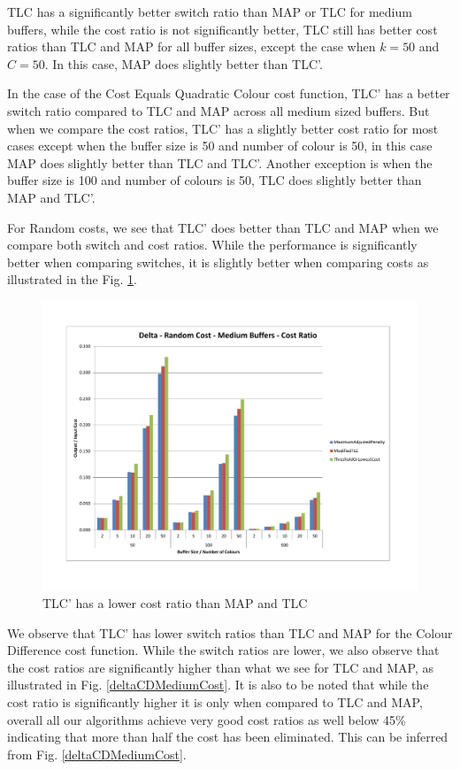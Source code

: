 TLC has a significantly better switch ratio than MAP or TLC for medium buffers, while the cost ratio is not significantly better, TLC still has better cost ratios than TLC and MAP for all buffer sizes, except the case when $k = 50$ and $C = 50$. In this case, MAP does slightly better than TLC'. 

In the case of the Cost Equals Quadratic Colour cost function, TLC' has a better switch ratio compared to TLC and MAP across all medium sized buffers. But when we compare the cost ratios, TLC' has a slightly better cost ratio for most cases except when the buffer size is 50 and number of colour is 50, in this case MAP does slightly better than TLC and TLC'. Another exception is when the buffer size is 100 and number of colours is 50, TLC does slightly better than MAP and TLC'. 

For Random costs, we see that TLC' does better than TLC and MAP when we compare both switch and cost ratios. While the performance is significantly better when comparing switches, it is slightly better when comparing costs as illustrated in the Fig.  \ref{deltaRCMediumCost}.

\begin{figure}[ht]
\centering 
\includegraphics[scale=0.60]{Delta-rc-medium-cost.pdf}
\caption{TLC' has a lower cost ratio than MAP and TLC}
\label{deltaRCMediumCost}
\end{figure}   

We observe that TLC' has lower switch ratios than TLC and MAP for the Colour Difference cost function. While the switch ratios are lower, we also observe that the cost ratios are significantly higher than what we see for TLC and MAP, as illustrated in Fig. \ref{deltaCDMediumCost}. It is also to be noted that while the cost ratio is significantly higher it is only when compared to TLC and MAP, overall all our algorithms achieve very good cost ratios as well below 45\% indicating that more than half the cost has been eliminated. This can be inferred from Fig. \ref{deltaCDMediumCost}.

